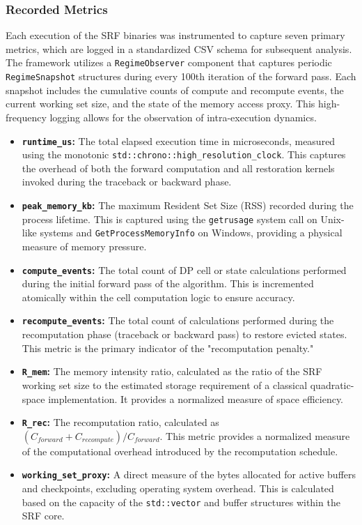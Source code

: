 \subsubsection{Recorded Metrics}

Each execution of the SRF binaries was instrumented to capture seven primary metrics, which are logged in a standardized CSV schema for subsequent analysis. The framework utilizes a \texttt{RegimeObserver} component that captures periodic \texttt{RegimeSnapshot} structures during every 100th iteration of the forward pass. Each snapshot includes the cumulative counts of compute and recompute events, the current working set size, and the state of the memory access proxy. This high-frequency logging allows for the observation of intra-execution dynamics.

\begin{itemize}
    \item \textbf{\texttt{runtime\_us}:} The total elapsed execution time in microseconds, measured using the monotonic \texttt{std::chrono::high\_resolution\_clock}. This captures the overhead of both the forward computation and all restoration kernels invoked during the traceback or backward phase.
    \item \textbf{\texttt{peak\_memory\_kb}:} The maximum Resident Set Size (RSS) recorded during the process lifetime. This is captured using the \texttt{getrusage} system call on Unix-like systems and \texttt{GetProcessMemoryInfo} on Windows, providing a physical measure of memory pressure.
    \item \textbf{\texttt{compute\_events}:} The total count of DP cell or state calculations performed during the initial forward pass of the algorithm. This is incremented atomically within the cell computation logic to ensure accuracy.
    \item \textbf{\texttt{recompute\_events}:} The total count of calculations performed during the recomputation phase (traceback or backward pass) to restore evicted states. This metric is the primary indicator of the "recomputation penalty."
    \item \textbf{\texttt{R\_mem}:} The memory intensity ratio, calculated as the ratio of the SRF working set size to the estimated storage requirement of a classical quadratic-space implementation. It provides a normalized measure of space efficiency.
    \item \textbf{\texttt{R\_rec}:} The recomputation ratio, calculated as $(C_{forward} + C_{recompute}) / C_{forward}$. This metric provides a normalized measure of the computational overhead introduced by the recomputation schedule.
    \item \textbf{\texttt{working\_set\_proxy}:} A direct measure of the bytes allocated for active buffers and checkpoints, excluding operating system overhead. This is calculated based on the capacity of the \texttt{std::vector} and buffer structures within the SRF core.
\end{itemize}

